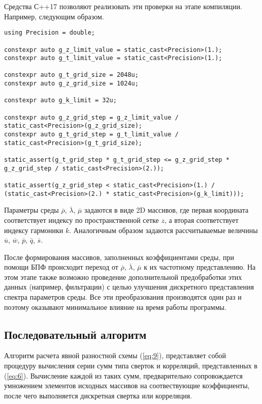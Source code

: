 Средства С++17 позволяют реализовать эти проверки на этапе компиляции. Например, следующим образом.

\begin{lstlisting}[style={CppCodeStyle}]
using Precision = double;

constexpr auto g_z_limit_value = static_cast<Precision>(1.);
constexpr auto g_t_limit_value = static_cast<Precision>(1.);

constexpr auto g_t_grid_size = 2048u;
constexpr auto g_z_grid_size = 1024u;

constexpr auto g_k_limit = 32u;

constexpr auto g_z_grid_step = g_z_limit_value / static_cast<Precision>(g_z_grid_size);
constexpr auto g_t_grid_step = g_t_limit_value / static_cast<Precision>(g_t_grid_size);

static_assert(g_t_grid_step * g_t_grid_step <= g_z_grid_step * g_z_grid_step / static_cast<Precision>(2.));

static_assert(g_z_grid_step < static_cast<Precision>(1.) / (static_cast<Precision>(2.) * static_cast<Precision>(g_k_limit)));
\end{lstlisting}

Параметры среды $\overline\rho$, $\overline\lambda$, $\overline\mu$ задаются в виде 2D массивов, 
где первая координата соответствует индексу по пространственной сетке $z$, а вторая соответствует индексу гармоники $k$.
Аналогичным образом задаются рассчитываемые величины $\overline u$, $\overline w$, $\overline p$, $\overline q$, $\overline s$.

После формирования массивов, заполненных коэффициентами среды, при помощи БПФ происходит переход от $\overline\rho$, $\overline\lambda$, $\overline\mu$ к их частотному представлению. На этом этапе также возможно проведение дополнительной предобработки этих данных (например, фильтрации) с целью улучшения дискретного представления спектра параметров среды. Все эти преобразования производятся один раз и поэтому оказывают минимальное влияние на время работы программы. 

\subsection{Последовательный алгоритм}

Алгоритм расчета явной разностной схемы (\ref{eq:9}), представляет собой процедуру вычисления серии сумм типа сверток и корреляций,
представленных в (\ref{eq:6}). Вычисление каждой из таких сумм, предварительно сопровождается умножением элементов исходных 
массивов на соотвествующие коэффициенты, после чего выполняется дискретная свертка или корреляция.

